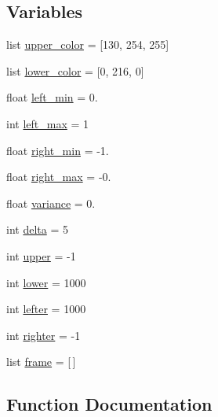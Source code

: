 \subsection*{Variables}
\begin{DoxyCompactItemize}
\item 
list \mbox{\hyperlink{namespacetoxic__vision_1_1lane__detector_a94ff4bb09c23548d1a94f4dd8978cb1a}{upper\+\_\+color}} = \mbox{[}130, 254, 255\mbox{]}
\item 
list \mbox{\hyperlink{namespacetoxic__vision_1_1lane__detector_a2ff87749e4f06182f1559f3d28a58e7d}{lower\+\_\+color}} = \mbox{[}0, 216, 0\mbox{]}
\item 
float \mbox{\hyperlink{namespacetoxic__vision_1_1lane__detector_adf212cc3e93c57c16e7b47a5bd76f935}{left\+\_\+min}} = 0.
\item 
int \mbox{\hyperlink{namespacetoxic__vision_1_1lane__detector_a67e59ed32e1bd6ac26bd569779b86c04}{left\+\_\+max}} = 1
\item 
float \mbox{\hyperlink{namespacetoxic__vision_1_1lane__detector_a46aacb8966a5e9386aab8e9af088126e}{right\+\_\+min}} = -\/1.
\item 
float \mbox{\hyperlink{namespacetoxic__vision_1_1lane__detector_a8e996d0c25ae835103533fb069c1b76c}{right\+\_\+max}} = -\/0.
\item 
float \mbox{\hyperlink{namespacetoxic__vision_1_1lane__detector_aec967762d2c44e3594070dca470ae334}{variance}} = 0.
\item 
int \mbox{\hyperlink{namespacetoxic__vision_1_1lane__detector_a1dfcb70b9229f2da17dd5922b87ecf2c}{delta}} = 5
\item 
int \mbox{\hyperlink{namespacetoxic__vision_1_1lane__detector_a0a1a19aadb8cf4f2b05d37a8798b667c}{upper}} = -\/1
\item 
int \mbox{\hyperlink{namespacetoxic__vision_1_1lane__detector_ac13b052b7d9ebd654550edf0944ad270}{lower}} = 1000
\item 
int \mbox{\hyperlink{namespacetoxic__vision_1_1lane__detector_a9e298bcb8e1d053f209516a82632bc3f}{lefter}} = 1000
\item 
int \mbox{\hyperlink{namespacetoxic__vision_1_1lane__detector_a4d380766225f8ae89ebe3fa887f0e81f}{righter}} = -\/1
\item 
list \mbox{\hyperlink{namespacetoxic__vision_1_1lane__detector_a9c845a56c4d49b65dea74d4e4f9df6d1}{frame}} = \mbox{[}$\,$\mbox{]}
\end{DoxyCompactItemize}


\subsection{Function Documentation}
\mbox{\label{namespacetoxic__vision_1_1lane__detector_a7a56502e886845d86ce39e37d087b5a8}} 
